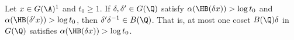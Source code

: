 Let $x\in G(\A)^1$ and $t_0\ge1$. If $\delta,\delta'\in G(\Q)$ satisfy $\alpha(\HB(\delta x))>\log t_0$ and
$\alpha(\HB(\delta'x))>\log t_0$, then $\delta'\delta^{-1}\in B(\Q)$. That is, at most one coset $B(\Q)\delta$ in
$G(\Q)$ satisfies $\alpha(\HB(\delta x))>\log t_0$.
